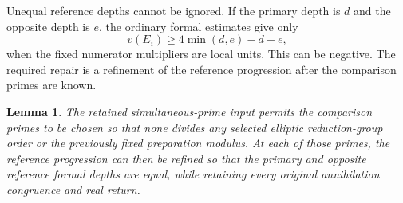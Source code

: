 \documentclass[11pt,a4paper]{article}
\newtheorem{lemma}[proposition]{Lemma}
\begin{document}
Unequal reference depths cannot be ignored. If the primary depth is
$d$ and the opposite depth is $e$, the ordinary formal estimates give
only
\[
                        v(E_i)\ge4\min(d,e)-d-e,
\]
when the fixed numerator multipliers are local units. This can be
negative. The required repair is a refinement of the reference
progression after the comparison primes are known.

\begin{lemma}\label{lem:sync}
The retained simultaneous-prime input permits the comparison primes
to be chosen so that none divides any selected elliptic reduction-group
order or the previously fixed preparation modulus. At each of those
primes, the reference progression can then be refined so that the
primary and opposite reference formal depths are equal, while
retaining every original annihilation congruence and real return.
\end{lemma}
\end{document}
